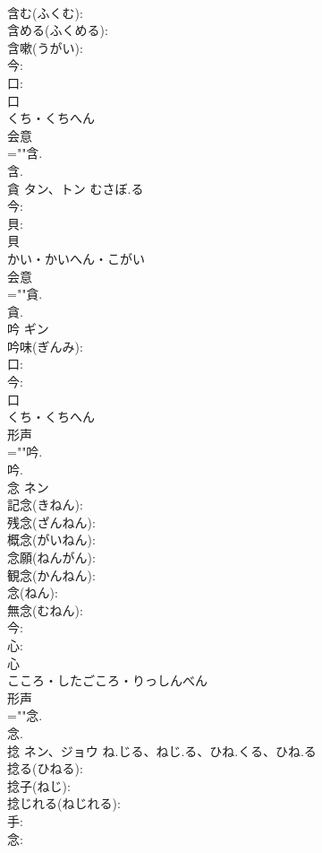 \documentclass[8pt]{extreport}
\begin{document}
\begin{CJK}{UTF8}{min}
\\	含む(ふくむ): 
\\	含める(ふくめる): 
\\	含嗽(うがい): 
\\	今: 
\\	口: 
\\	口	
\\	くち・くちへん	
\\	会意 
\\	=""含.
\\	含.
\\	貪	タン、トン	むさぼ.る		
\\	今: 
\\	貝: 
\\	貝	
\\	かい・かいへん・こがい	
\\	会意 
\\	=""貪.
\\	貪.
\\	吟	ギン			
\\	吟味(ぎんみ): 
\\	口: 
\\	今: 
\\	口	
\\	くち・くちへん	
\\	形声 
\\	=""吟.
\\	吟.
\\	念	ネン			
\\	記念(きねん): 
\\	残念(ざんねん): 
\\	概念(がいねん): 
\\	念願(ねんがん): 
\\	観念(かんねん): 
\\	念(ねん): 
\\	無念(むねん): 
\\	今: 
\\	心: 
\\	心	
\\	こころ・したごころ・りっしんべん	
\\	形声 
\\	=""念.
\\	念.
\\	捻	ネン、ジョウ	ね.じる、ねじ.る、ひね.くる、ひね.る		
\\	捻る(ひねる): 
\\	捻子(ねじ): 
\\	捻じれる(ねじれる): 
\\	手: 
\\	念: 

\end{CJK}
\end{document}
